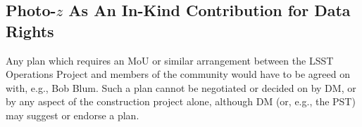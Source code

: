 \documentclass[DM,lsstdraft,toc]{lsstdoc}
\begin{document}
\subsection{Photo-$z$ As An In-Kind Contribution for Data Rights}\label{ssec:dmingest_inkind}

Any plan which requires an MoU or similar arrangement between the LSST Operations Project and members of the community would have to be agreed on with, e.g., Bob Blum.
Such a plan cannot be negotiated or decided on by DM, or by any aspect of the construction project alone, although DM (or, e.g., the PST) may suggest or endorse a plan.




\end{document}
